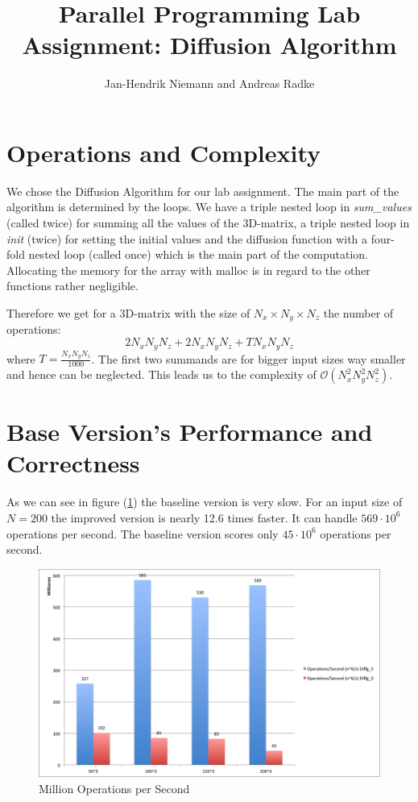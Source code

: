 \documentclass[12pt,a4paper]{article}
\author{Jan-Hendrik Niemann and Andreas Radke}
\title{Parallel Programming Lab Assignment: Diffusion Algorithm}
\begin{document}
	\maketitle
	
\section{Operations and Complexity}\label{chp:opcom}

We chose the Diffusion Algorithm for our lab assignment.
The main part of the algorithm is determined by the loops. We have a triple nested loop in \emph{sum\_values} (called twice) for summing all the values of the 3D-matrix, a triple nested loop in \emph{init} (twice) for setting the initial values and the diffusion function with a four-fold nested loop (called once) which is the main part of the computation. Allocating the memory for the array with malloc is in regard to the other functions rather negligible. 

Therefore we get for a 3D-matrix with the size of $ N_x\times N_y \times N_z $ the number of operations: \[ 2 N_x N_y N_z + 2 N_x N_y N_z + T N_x N_y N_z \]
where $ T =  \frac{N_x N_y N_z}{1000}$.
The first two summands are for bigger input sizes way smaller and hence can be neglected. This leads us to the complexity of $ \mathcal{O}(N_x^2 N_y^2 N_z^2) $.

\section{Base Version's Performance and Correctness}

As we can see in figure (\ref{fig:oper}) the baseline version is very slow. For an input size of $N=200$ the improved version is nearly 12.6 times faster. It can handle $569\cdot10^6$ operations per second. The baseline version scores only $45\cdot10^6$ operations per second.

\begin{figure}[h]
	\centering
	\includegraphics[width=1.0\linewidth]{"Benchmark 2/oper"}
	\caption{Million Operations per Second}
	\label{fig:oper}
\end{figure}
\end{document}
